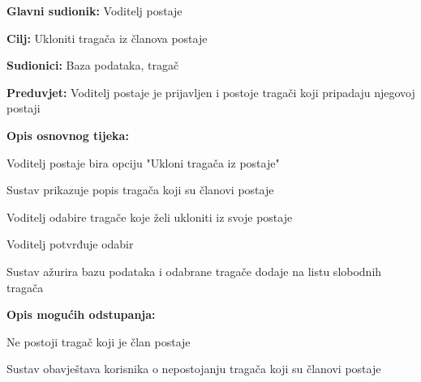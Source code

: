 					\noindent {}
					\begin{packed_item}
						
						\item \textbf{Glavni sudionik:} Voditelj postaje
						\item \textbf{Cilj:} Ukloniti tragača iz članova postaje
						\item \textbf{Sudionici:} Baza podataka, tragač
						\item \textbf{Preduvjet:} Voditelj postaje je prijavljen i postoje tragači koji pripadaju njegovoj postaji
						\item \textbf{Opis osnovnog tijeka:}
						
						\item[] \begin{packed_enum}
							
							\item Voditelj postaje bira opciju "Ukloni tragača iz postaje" 
							\item Sustav prikazuje popis tragača koji su članovi postaje
							\item Voditelj odabire tragače koje želi ukloniti iz svoje postaje 
							\item Voditelj potvrđuje odabir 
							\item Sustav ažurira bazu podataka i odabrane tragače dodaje na listu slobodnih tragača
						\end{packed_enum}
						
						\item  \textbf{Opis mogućih odstupanja:}
						
						\item[] \begin{packed_item}
							
							\item[2.a] Ne postoji tragač koji je član postaje
							\item[] \begin{packed_enum}
								
								\item Sustav obavještava korisnika o nepostojanju tragača koji su članovi postaje
								
							\end{packed_enum}
						\end{packed_item}
					\end{packed_item}
					
